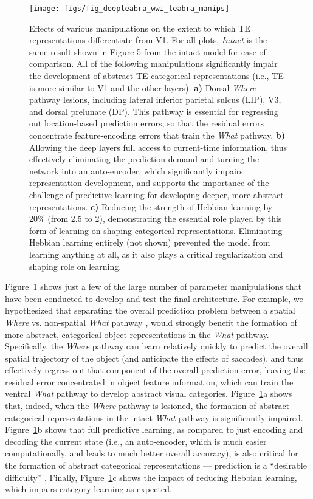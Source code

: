 \documentclass[11pt,twoside]{article}
\newif\myifpdf
\begin{document}
\begin{figure}
  \centering\texttt{[image: figs/fig\_deepleabra\_wwi\_leabra\_manips]}
  \caption{Effects of various manipulations on the extent to which TE representations differentiate from V1.  For all plots, \emph{Intact} is the same result shown in Figure 5 from the intact model for ease of comparison.  All of the following  manipulations significantly impair the development of abstract TE categorical representations (i.e., TE is more similar to V1 and the other layers).  {\bf a)} Dorsal \emph{Where} pathway lesions, including lateral inferior parietal sulcus (LIP), V3, and dorsal prelunate (DP).  This pathway is essential for regressing out location-based prediction errors, so that the residual errors concentrate feature-encoding errors that train the \emph{What} pathway.  {\bf b)} Allowing the deep layers full access to current-time information, thus effectively eliminating the prediction demand and turning the network into an auto-encoder, which significantly impairs representation development, and supports the importance of the challenge of predictive learning for developing deeper, more abstract representations.  {\bf c)} Reducing the strength of Hebbian learning by 20\% (from 2.5 to 2), demonstrating the essential role played by this form of learning on shaping categorical representations.  Eliminating Hebbian learning entirely (not shown) prevented the model from learning anything at all, as it also plays a critical regularization and shaping role on learning.}
  \label{fig.manips}
\end{figure}

Figure~\ref{fig.manips} shows just a few of the large number of parameter manipulations that have been conducted to develop and test the final architecture.  For example, we hypothesized that separating the overall prediction problem between a spatial \emph{Where} vs. non-spatial \emph{What} pathway \citep{UngerleiderMishkin82,GoodaleMilner92}, would strongly benefit the formation of more abstract, categorical object representations in the \emph{What} pathway.  Specifically, the \emph{Where} pathway can learn relatively quickly to predict the overall spatial trajectory of the object (and anticipate the effects of saccades), and thus effectively regress out that component of the overall prediction error, leaving the residual error concentrated in object feature information, which can train the ventral \emph{What} pathway to develop abstract visual categories.  Figure~\ref{fig.manips}a shows that, indeed, when the \emph{Where} pathway is lesioned, the formation of abstract categorical representations in the intact \emph{What} pathway is significantly impaired.  Figure~\ref{fig.manips}b shows that full predictive learning, as compared to just encoding and decoding the current state (i.e., an auto-encoder, which is much easier computationally, and leads to much better overall accuracy), is also critical for the formation of abstract categorical representations --- prediction is a ``desirable difficulty'' \citep{Bjork94}.  Finally, Figure~\ref{fig.manips}c shows the impact of reducing Hebbian learning, which impairs category learning as expected.
\end{document}
